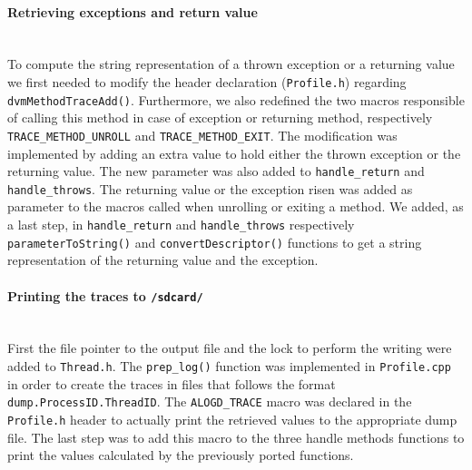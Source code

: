\paragraph{Retrieving exceptions and return value} ~\\
To compute the string representation of a thrown exception or a
returning value we first needed to modify the header declaration
(\texttt{Profile.h}) regarding
\texttt{dvmMethodTraceAdd()}. Furthermore, we also redefined the two
macros responsible of calling this method in case of exception or
returning method, respectively \texttt{TRACE\_METHOD\_UNROLL} and
\texttt{TRACE\_METHOD\_EXIT}. The modification was implemented by
adding an extra value to hold either the thrown exception or the
returning value. The new parameter was also added to
\texttt{handle\_return} and \texttt{handle\_throws}. The returning
value or the exception risen was added as parameter to 
the macros called when unrolling or exiting a method. We added, as a last step, in
\texttt{handle\_return} and \texttt{handle\_throws} respectively
\texttt{parameterToString()} and \texttt{convertDescriptor()}
functions to get a string representation of the returning value and
the exception.

\paragraph{Printing the traces to \texttt{/sdcard/}} ~\\
First the file pointer to the output file and the lock to perform the
writing were added to \texttt{Thread.h}. The \texttt{prep\_log()}
function was implemented in \texttt{Profile.cpp} in order to create
the traces in files that follows the format
\texttt{dump.ProcessID.ThreadID}. The \texttt{ALOGD\_TRACE} macro was
declared in the \texttt{Profile.h} header to actually print the
retrieved values to the appropriate dump file. The last step was to
add this macro to the three handle methods functions to print the
values calculated by the previously ported functions.
